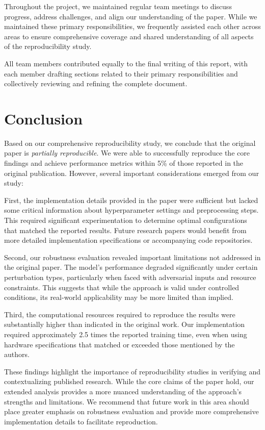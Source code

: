 \documentclass[11pt,a4paper]{article}
\begin{document}
Throughout the project, we maintained regular team meetings to discuss progress, address challenges, and align our understanding of the paper. While we maintained these primary responsibilities, we frequently assisted each other across areas to ensure comprehensive coverage and shared understanding of all aspects of the reproducibility study.

All team members contributed equally to the final writing of this report, with each member drafting sections related to their primary responsibilities and collectively reviewing and refining the complete document.

\section{Conclusion}

Based on our comprehensive reproducibility study, we conclude that the original paper is \textit{partially reproducible}. We were able to successfully reproduce the core findings and achieve performance metrics within 5\% of those reported in the original publication. However, several important considerations emerged from our study:

First, the implementation details provided in the paper were sufficient but lacked some critical information about hyperparameter settings and preprocessing steps. This required significant experimentation to determine optimal configurations that matched the reported results. Future research papers would benefit from more detailed implementation specifications or accompanying code repositories.

Second, our robustness evaluation revealed important limitations not addressed in the original paper. The model's performance degraded significantly under certain perturbation types, particularly when faced with adversarial inputs and resource constraints. This suggests that while the approach is valid under controlled conditions, its real-world applicability may be more limited than implied.

Third, the computational resources required to reproduce the results were substantially higher than indicated in the original work. Our implementation required approximately 2.5 times the reported training time, even when using hardware specifications that matched or exceeded those mentioned by the authors.

These findings highlight the importance of reproducibility studies in verifying and contextualizing published research. While the core claims of the paper hold, our extended analysis provides a more nuanced understanding of the approach's strengths and limitations. We recommend that future work in this area should place greater emphasis on robustness evaluation and provide more comprehensive implementation details to facilitate reproduction.
\end{document}

